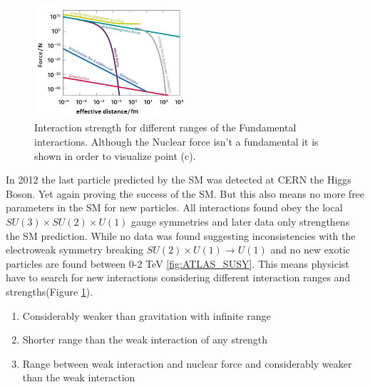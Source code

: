 \documentclass[../Bachelorarbeit.tex]{subfiles}
\begin{document}
\label{sec:BSM}
\begin{figure}
    \centering
    \includegraphics[width=0.5\textwidth]{images/Teilchenwet_WW_range.png}
    \caption{Interaction strength for different ranges of the Fundamental interactions. Although the Nuclear force isn't a fundamental it is shown in order to visualize point (c).  \cite{Teilchenwelt} }
    \label{fig:WW_range}
\end{figure}

In 2012 the last particle predicted by the SM was detected at CERN the Higgs Boson. Yet again proving the success of the SM.
But this also means no more free parameters in the SM for new particles. All interactions found obey the local $SU(3) \times SU(2) \times U(1)$ gauge symmetries
and later data only strengthens the SM prediction. While no data was found suggesting inconsistencies with the electroweak symmetry breaking $SU(2) \times U(1) \rightarrow U(1)$
and no new exotic particles are found between 0-2 TeV \ref{fig:ATLAS_SUSY}.
This means physicist have to search for new interactions considering different interaction ranges and strengths(Figure \ref{fig:WW_range}).
\begin{enumerate}[label=(\alph*)]
    \item Considerably weaker than gravitation with infinite range
    \item Shorter range than the weak interaction of any strength
    \item Range between weak interaction and nuclear force and considerably weaker than the weak interaction
\end{enumerate}
\end{document}

